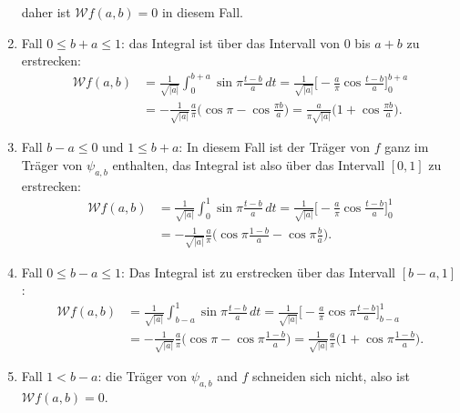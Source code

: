 \begin{loesung}
\begin{teilaufgaben}
\begin{enumerate}
daher ist $\mathcal{W}f(a,b)=0$ in diesem Fall.
\item 
Fall $0\le b+a\le 1$: das Integral ist über das Intervall von $0$ bis $a+b$ zu
erstrecken:
\begin{align*}
\mathcal{W}f(a,b)
&=
\frac{1}{\sqrt{|a|}}
\int_0^{b+a} \sin\pi\frac{t-b}{a}\,dt
=
\frac{1}{\sqrt{|a|}}
\biggl[
-\frac{a}{\pi} \cos\frac{t-b}{a}
\biggr]_0^{b+a}
\\
&=
-
\frac{1}{\sqrt{|a|}}
\frac{a}{\pi}
\biggl(
\cos \pi
-
\cos\frac{\pi b}{a}
\biggr)
=
\frac{a}{\pi\sqrt{|a|}}
\biggl(1+\cos\frac{\pi b}{a}\biggr).
\end{align*}
\item
Fall $b-a \le 0$ und $1 \le b+a$: In diesem Fall ist der Träger von $f$
ganz im Träger von $\psi_{a,b}$ enthalten, das Integral ist also über das
Intervall $[0,1]$ zu erstrecken:
\begin{align*}
\mathcal{W}f(a,b)
&=
\frac{1}{\sqrt{|a|}}
\int_0^1 
\sin \pi\frac{t-b}{a}
\,dt
=
\frac{1}{\sqrt{|a|}}
\biggl[
-\frac{a}{\pi} \cos\frac{t-b}{a}
\biggr]_0^1
\\
&=
-\frac{1}{\sqrt{|a|}}
\frac{a}{\pi}
\biggl(
\cos\pi\frac{1-b}{a}
-
\cos\pi \frac{b}{a}
\biggr).
\end{align*}
\item
Fall $0\le b-a\le 1$: Das Integral ist zu erstrecken über das Intervall
$[b-a,1]$:
\begin{align*}
\mathcal{W}f(a,b)
&=
\frac{1}{\sqrt{|a|}}
\int_{b-a}^1
\sin\pi\frac{t-b}{a}\,dt
=
\frac{1}{\sqrt{|a|}}
\biggl[
-
\frac{a}{\pi} \cos\pi\frac{t-b}{a}
\biggr]_{b-a}^1
\\
&=
-
\frac{1}{\sqrt{|a|}}
\frac{a}{\pi}
\biggl(
\cos\pi
-
\cos\pi\frac{1-b}{a}
\biggr)
=
\frac{1}{\sqrt{|a|}}
\frac{a}{\pi}\biggl(
1+\cos\pi\frac{1-b}a
\biggr).
\end{align*}
\item
Fall $1<b-a$: die Träger von $\psi_{a,b}$ and $f$ schneiden sich nicht,
also ist $\mathcal{W}f(a,b)=0$.
\end{enumerate}
%
%
\begin{figure}
\centering

\end{figure}
\end{teilaufgaben}
\end{loesung}
